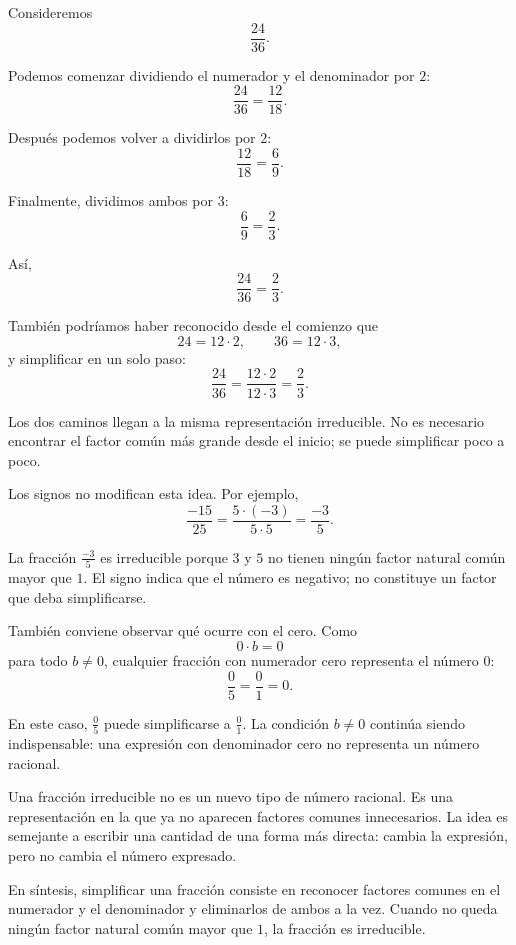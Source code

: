 \begin{example}
Consideremos
\[
\frac{24}{36}.
\]

Podemos comenzar dividiendo el numerador y el denominador por \(2\):
\[
\frac{24}{36}=\frac{12}{18}.
\]

Después podemos volver a dividirlos por \(2\):
\[
\frac{12}{18}=\frac69.
\]

Finalmente, dividimos ambos por \(3\):
\[
\frac69=\frac23.
\]

Así,
\[
\frac{24}{36}=\frac23.
\]

También podríamos haber reconocido desde el comienzo que
\[
24=12\cdot2,
\qquad
36=12\cdot3,
\]
y simplificar en un solo paso:
\[
\frac{24}{36}
=
\frac{12\cdot2}{12\cdot3}
=
\frac23.
\]

Los dos caminos llegan a la misma representación irreducible. No es necesario
encontrar el factor común más grande desde el inicio; se puede simplificar poco
a poco.
\end{example}

Los signos no modifican esta idea. Por ejemplo,
\[
\frac{-15}{25}
=
\frac{5\cdot(-3)}{5\cdot5}
=
\frac{-3}{5}.
\]

La fracción \(\frac{-3}{5}\) es irreducible porque \(3\) y \(5\) no tienen
ningún factor natural común mayor que \(1\). El signo indica que el número es
negativo; no constituye un factor que deba simplificarse.

También conviene observar qué ocurre con el cero. Como
\[
0\cdot b=0
\]
para todo \(b\ne0\), cualquier fracción con numerador cero representa el número
\(0\):
\[
\frac05=\frac01=0.
\]

En este caso, \(\frac05\) puede simplificarse a \(\frac01\). La condición
\(b\ne0\) continúa siendo indispensable: una expresión con denominador cero no
representa un número racional.

\begin{note}
Una fracción irreducible no es un nuevo tipo de número racional. Es una
representación en la que ya no aparecen factores comunes innecesarios. La idea
es semejante a escribir una cantidad de una forma más directa: cambia la
expresión, pero no cambia el número expresado.
\end{note}

En síntesis, simplificar una fracción consiste en reconocer factores comunes en
el numerador y el denominador y eliminarlos de ambos a la vez. Cuando no queda
ningún factor natural común mayor que \(1\), la fracción es irreducible.

